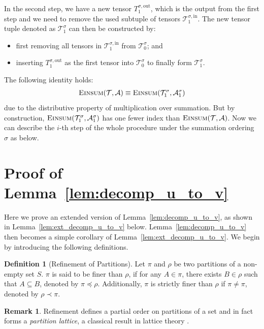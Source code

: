 \documentclass[sn-mathphys, natbib=false]{sn-jnl}
\theoremstyle{plain}
\theoremstyle{definition}
\newtheorem{definition}{Definition}
\newtheorem{remark}{Remark}
\newcommand{\sPi}{\pi}
\newcommand{\tensorcontraction}{\textsc{Einsum}}
\newcommand{\pleq}{\preceq}
\newcommand{\pless}{\prec}
\def\calA{\mathcal{A}}
\def\calT{\mathcal{T}}
\begin{document}
\begin{bibunit}[agsm]
    In the second step, we have a new tensor $T^{\sigma,\mathrm{out}}_{1}$, which is the output from the first step and we need to remove the used subtuple of tensors $\calT^{\sigma, \mathrm{in}}_{1}$. The new tensor tuple denoted as $\calT^{\sigma}_{1}$ can then be constructed by:
    \begin{itemize}
    \item first removing all tensors in $\calT^{\sigma, \mathrm{in}}_1$ from $\calT_{0}^{\sigma}$; and
    \item inserting $T^{\sigma,\mathrm{out}}_1$ as the first tensor into $\calT_{0}^{\sigma}$ to finally form $\calT^{\sigma}_{1}$.
    \end{itemize}
    The following identity holds:
    \begin{align*}
    \tensorcontraction(\calT, \calA) \equiv \tensorcontraction(\calT^\sigma_1, \calA^\sigma_1) 
    \end{align*}
    due to the distributive property of multiplication over summation. But by construction, $\tensorcontraction(\calT^\sigma_1, \calA^\sigma_1)$ has one fewer index than $\tensorcontraction(\calT, \calA)$. 
    Now we can describe the $i$-th step of the whole procedure under the summation ordering $\sigma$ as below.
\fi


\section{Proof of Lemma~\ref{lem:decomp_u_to_v}}
\label{app:decomp_u_stats}

Here we prove an extended version of Lemma~\ref{lem:decomp_u_to_v}, as shown in Lemma~\ref{lem:ext_decomp_u_to_v} below. Lemma~\ref{lem:decomp_u_to_v} then becomes a simple corollary of Lemma~\ref{lem:ext_decomp_u_to_v}. We begin by introducing the following definitions.

\begin{definition}[Refinement of Partitions]\label{def:refinement_of_partition}
Let $\sPi$ and $\rho$ be two partitions of a non-empty set $S$. $\sPi$ is said to be finer than $\rho$, if for any $A \in \sPi$, there exists $B \in \rho$ such that $A \subseteq B$, denoted by $\sPi \pleq \rho$. Additionally, $\sPi$ is strictly finer than $\rho$ if $\sPi \neq \sPi$, denoted by $\rho \pless \sPi$. 
\end{definition}

\begin{remark}
Refinement defines a partial order on partitions of a set and in fact forms a \emph{partition lattice}, a classical result in lattice theory \citep{birkhoff1940lattice}. 
\end{remark}


\end{bibunit}
\end{document}
